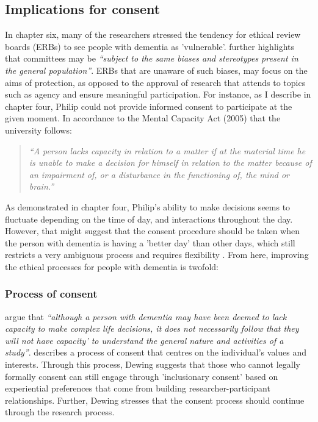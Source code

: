 \subsection{Implications for consent}
\label{Cosent-Implications}
In chapter six, many of the researchers stressed the tendency for ethical review boards (ERBs) to see people with dementia as 'vulnerable'. \cite{pachana_can_2014} further highlights that committees may be \textit{``subject to the same biases and stereotypes present in the general population''}. ERBs that are unaware of such biases, may focus on the aims of protection, as opposed to the approval of research that attends to topics such as agency and ensure meaningful participation. For instance, as I describe in chapter four, Philip could not provide informed consent to participate at the given moment. In accordance to the Mental Capacity Act (2005) that the university follows:

\begin{quote}
\textit{``A person lacks capacity in relation to a matter if at the material time he is unable to make a decision for himself in relation to the matter because of an impairment of, or a disturbance in the functioning of, the mind or brain.''} \citep{oyebode_mental_2005}
\end{quote}

As demonstrated in chapter four, Philip's ability to make decisions seems to fluctuate depending on the time of day, and interactions throughout the day. However, that might suggest that the consent procedure should be taken when the person with dementia is having a 'better day' than other days, which still restricts a very ambiguous process and requires flexibility \citep{trachsel2015cognitive}. From here, improving the ethical processes for people with dementia is twofold:
 
\subsubsection{Process of consent}
\label{ProcesOfConsent}
\cite{o2021advocating} argue that \textit{``although a person with dementia may have been deemed to lack capacity to make complex life decisions, it does not necessarily follow that they will not have capacity' to understand the general nature and activities of a study''}. \cite{dewing_participatory_2007} describes a process of consent that centres on the individual's values and interests. Through this process, Dewing suggests that those who cannot legally formally consent can still engage through 'inclusionary consent' based on experiential preferences that come from building researcher-participant relationships. Further, Dewing stresses that the consent process should continue through the research process.

